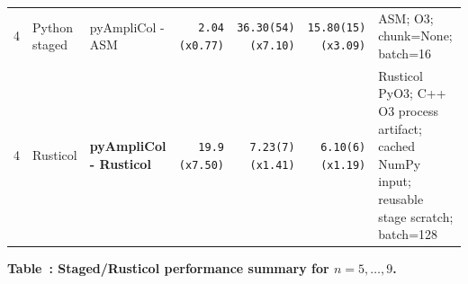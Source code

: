 \documentclass[10pt]{article}
\begin{document}
\begin{landscape}
\begin{center}
\begin{tabular}{@{}r L{0.92in} L{1.52in} r r r L{3.18in}@{}}
4 & Python staged & pyAmpliCol - ASM & \texttt{2.04} \textcolor{speedgreen}{\texttt{(x0.77)}} & \texttt{36.30(54)} \textcolor{speedred}{\texttt{(x7.10)}} & \texttt{15.80(15)} \textcolor{speedred}{\texttt{(x3.09)}} & ASM; O3; chunk=None; batch=16 \\
 4 & Rusticol & \textbf{pyAmpliCol - Rusticol} & \texttt{19.9} \textcolor{speedred}{\texttt{(x7.50)}} & \texttt{7.23(7)} \textcolor{speedorange}{\texttt{(x1.41)}} & \texttt{6.10(6)} \textcolor{speedorange}{\texttt{(x1.19)}} & Rusticol PyO3; C++ O3 process artifact; cached NumPy input; reusable stage scratch; batch=128 \\
\bottomrule
\end{tabular}
\end{center}

\clearpage
\begin{center}
\label{tab:combined-results-5-9}
\textbf{Table~\thetable: Staged/Rusticol performance summary for \(n=5,\ldots,9\).}
\vspace{0.35em}


\end{center}
\end{landscape}
\end{document}
